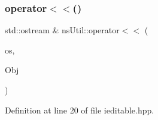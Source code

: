 \subsubsection{\texorpdfstring{operator$<$$<$()}{operator<<()}}
{\footnotesize\ttfamily std\+::ostream \& ns\+Util\+::operator$<$$<$ (\begin{DoxyParamCaption}\item[{std\+::ostream \&}]{os,  }\item[{const \hyperlink{classns_util_1_1_i_editable}{I\+Editable} \&}]{Obj }\end{DoxyParamCaption})\hspace{0.3cm}{\ttfamily [inline]}}



Definition at line 20 of file ieditable.\+hpp.


